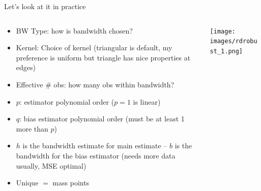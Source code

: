 \documentclass[notes,11pt, aspectratio=169]{beamer}
\begin{document}
\begin{frame}{Let's look at it in practice}
    \begin{columns}[onlytextwidth, T] %
      \begin{column}{.6\textwidth}
        \begin{itemize}
        \item BW Type: how is bandwidth chosen? 
        \item Kernel: Choice of kernel (triangular is default, my
          preference is uniform but triangle has nice properties at edges)
        \item Effective \# obs: how many obs within bandwidth?
        \item $p$: estimator polynomial order ($p=1$ is linear)
        \item $q$: bias estimator polynomial order (must be at least 1 more than $p$)
        \item $h$ is the bandwidth estimate for main estimate -- $b$
          is the bandwidth for the bias estimator (needs more data usually, MSE optimal)
        \item Unique $=$ mass points
        \end{itemize}
      \end{column}%
      \hfill%
      \begin{column}{.4\textwidth}
        \texttt{[image: images/rdrobust\_1.png]}
      \end{column}%
    \end{columns}
\end{frame}
\end{document}
